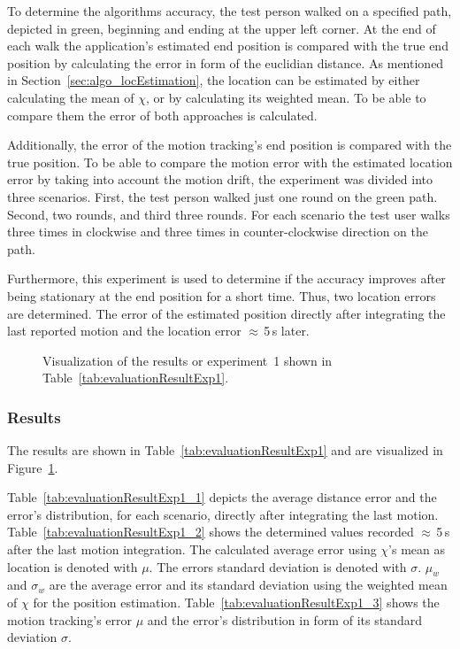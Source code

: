 To determine the algorithms accuracy, the test person walked on a specified path, depicted in green, beginning and ending at the upper left corner. At the end of each walk the application's estimated end position is compared with the true end position by calculating the error in form of the euclidian distance. As mentioned in Section~\ref{sec:algo_locEstimation}, the location can be estimated by either calculating the mean of $\chi$, or by calculating its weighted mean. To be able to compare them the error of both approaches is calculated.

Additionally, the error of the motion tracking's end position is compared with the true position. To be able to compare the motion error with the estimated location error by taking into account the motion drift, the experiment was divided into three scenarios. First, the test person walked just one round on the green path. Second, two rounds, and third three rounds. For each scenario the test user walks three times in clockwise and three times in counter-clockwise direction on the path.

Furthermore, this experiment is used to determine if the accuracy improves after being stationary at the end position for a short time. Thus, two location errors are determined. The error of the estimated position directly after integrating the last reported motion and the location error $\approx$\,5\,s later.


\begin{table}
	
	\caption{Results of experiment~1.}
	\label{tab:evaluationResultExp1}
\end{table}

\begin{figure}
	
	\caption{Visualization of the results or experiment~1 shown in Table~\ref{tab:evaluationResultExp1}.}
	\label{fig:exp1_visualization}
\end{figure}

\subsubsection*{Results}
The results are shown in Table~\ref{tab:evaluationResultExp1} and are visualized in Figure~\ref{fig:exp1_visualization}.

Table~\ref{tab:evaluationResultExp1_1} depicts the average distance error and the error's distribution, for each scenario, directly after integrating the last motion. Table~\ref{tab:evaluationResultExp1_2} shows the determined values recorded $\approx$\,5\,s after the last motion integration. The calculated average error using $\chi$'s mean as location is denoted with $\mu$. The errors standard deviation is denoted with $\sigma$. $\mu_w$ and $\sigma_w$ are the average error and its standard deviation using the weighted mean of $\chi$ for the position estimation.
Table~\ref{tab:evaluationResultExp1_3} shows the motion tracking's error $\mu$ and the error's distribution in form of its standard deviation $\sigma$.

